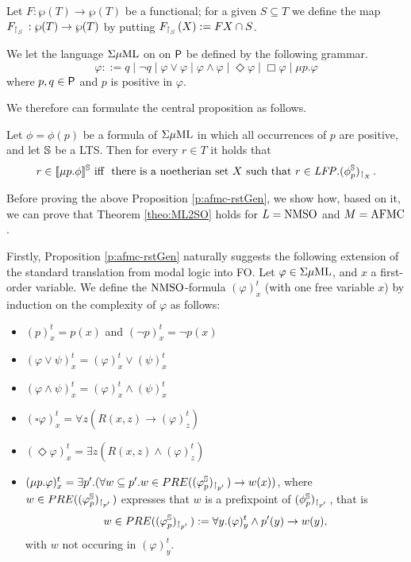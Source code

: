 \begin{definition}
\label{d:rst}
Let $F: \wp(T)\to \wp(T)$ be a functional; for a given $S \subseteq T$ we define
the map $F_{{\upharpoonright}_{S}\,}: \wp(T)\to \wp(T)$ by putting $F_{{\upharpoonright}_{S}\,}(X) :=
FX \cap S$.
\end{definition}

\begin{definition} We let the language $\Sigma\mu\mathrm{ML}$ on on $\mathsf{P}$ be defined by the following grammar. 
   \[
   \varphi ::= q \mid \neg q 
   \mid \varphi \lor \varphi \mid \varphi \land \varphi 
   \mid \Diamond\varphi \mid \Box\varphi 
   \mid \mu p. \varphi
   \]
   where $p,q \in \mathsf{P}$ and $p$ is positive in $\varphi$.
\end{definition}

We therefore can formulate the central proposition as follows.
\begin{proposition}
\label{p:afmc-rstGen}
Let $\phi = \phi(p)$ be a formula of $\Sigma\mu\mathrm{ML}$
in which all occurrences of $p$ are 
positive, and let $\mathbb{S}$ be a LTS.
Then for every $r \in T$ it holds that 
\begin{equation}
\label{eq:afmc-m}
r \in \mng{\mu p.\phi}^{\model} \text{ iff }
\text{ there is a noetherian set $X$ such that } r \in \LFP. (\phi^{\model}_{p})_{\rst{X}}.
\end{equation}
\end{proposition}

Before proving the above Proposition \ref{p:afmc-rstGen}, we show how, based on it, we can prove that Theorem \ref{theo:ML2SO} holds for $L=\mathrm{NMSO}$ and $M=\mathrm{AFMC}$.

Firstly, Proposition \ref{p:afmc-rstGen} naturally suggests the following extension of the standard translation from modal logic into FO.
Let $\varphi \in \Sigma\mu\mathrm{ML}$, and $x$ a first-order variable. We define the $\mathrm{NMSO}$-formula $(\varphi)^t_x$ (with one free variable $x$) by induction on the complexity of $\varphi$ as follows:

\begin{itemize}
\item $(p)^t_x=p(x)$ and $(\lnot p)^t_x=\lnot p(x)$
\item $(\varphi \lor \psi)^t_x=(\varphi)^t_x \lor (\psi)^t_x$ 
\item $(\varphi \land \psi)^t_x=(\varphi)^t_x \land (\psi)^t_x$ 
\item $(\square \varphi )^t_x= \forall z ( R(x,z) \to (\varphi)^t_z )$ 
\item $(\Diamond \varphi )^t_x= \exists z ( R(x,z) \land (\varphi)^t_z )$ 
\item $ (\mu p. \varphi)^t_x= \exists p'.(\forall  w \subseteq p'. w \in PRE((\varphi^{\mathbb{S}}_{p})_{{\upharpoonright}_{p'}\,}) \to w(x))$,  where $w \in PRE((\varphi^{\mathbb{S}}_{p})_{{\upharpoonright}_{p'}\,})$ expresses that $w$ is a prefixpoint of $(\phi^{\mathbb{S}}_{p})_{{\upharpoonright}_{p'}\,}$, that is
$$w  \in PRE((\varphi^{\mathbb{S}}_{p})_{{\upharpoonright}_{p'}\,}):= \forall y. (\varphi)^t_y \land p'(y) \to w(y),$$ with $w$ not occuring in $(\varphi)^t_y$.
\end{itemize}

